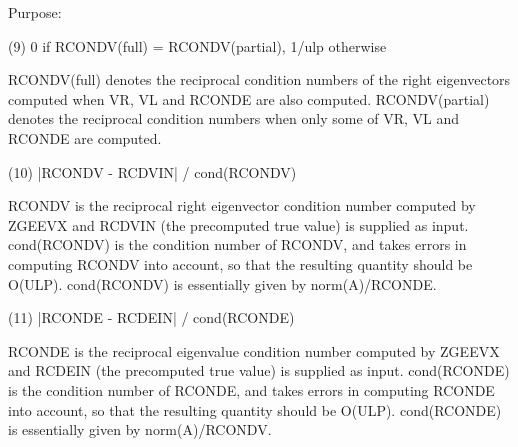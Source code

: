 \begin{DoxyParagraph}{Purpose\+: }
\begin{DoxyVerb}
    (9)     0 if RCONDV(full) = RCONDV(partial), 1/ulp otherwise

      RCONDV(full) denotes the reciprocal condition numbers of the
      right eigenvectors computed when VR, VL and RCONDE are also
      computed. RCONDV(partial) denotes the reciprocal condition
      numbers when only some of VR, VL and RCONDE are computed.

   (10)     |RCONDV - RCDVIN| / cond(RCONDV)

      RCONDV is the reciprocal right eigenvector condition number
      computed by ZGEEVX and RCDVIN (the precomputed true value)
      is supplied as input. cond(RCONDV) is the condition number of
      RCONDV, and takes errors in computing RCONDV into account, so
      that the resulting quantity should be O(ULP). cond(RCONDV) is
      essentially given by norm(A)/RCONDE.

   (11)     |RCONDE - RCDEIN| / cond(RCONDE)

      RCONDE is the reciprocal eigenvalue condition number
      computed by ZGEEVX and RCDEIN (the precomputed true value)
      is supplied as input.  cond(RCONDE) is the condition number
      of RCONDE, and takes errors in computing RCONDE into account,
      so that the resulting quantity should be O(ULP). cond(RCONDE)
      is essentially given by norm(A)/RCONDV.\end{DoxyVerb}
 
\end{DoxyParagraph}

